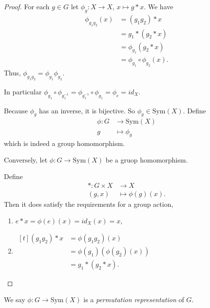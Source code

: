 \begin{proof}
    For each \(g \in G\) let \(\phi_g: X \to X\), \(x \mapsto g* x\). We have
    \begin{align*}
        \phi_{g_1 g_2}(x) &= (g_1 g_2)*x\\
        &= g_1*(g_2*x)\\
        &= \phi_{g_1}(g_2 * x)\\
        &= \phi_{g_1}\circ\phi_{g_2}(x).
    \end{align*}
    Thus, \(\phi_{g_1 g_2} = \phi_{g_1} \phi_{g_2}\).
    
    In particular \(\phi_{g_1} \circ \phi_{g_1^{-1}} = \phi_{g_1^{-1}} \circ \phi_{g_1} = \phi_e = id_X\).

    Because \(\phi_g\) has an inverse, it is bijective. So \(\phi_g \in \mathrm{Sym}(X)\).
    Define
    \begin{equation*}
    \begin{aligned}
    \phi\colon G & \longrightarrow \mathrm{Sym}(X)      \\
    g          & \longmapsto \phi_g
    \end{aligned}
    \end{equation*}
    which is indeed a group homomorphism.

    Conversely, let \(\phi: G \to \mathrm{Sym}(X)\) be a gruop homomorphism.

    Define
    \begin{equation*}
    \begin{aligned}
      *\colon G\times X & \longrightarrow X      \\
                (g,x)&\longmapsto \phi(g)(x).
    \end{aligned}
    \end{equation*}
    Then it does satisfy the requirements for a group action,
    \begin{enumerate}
        \item \(e*x = \phi(e)(x) = id_X(x) = x\),
        \item
        \(\begin{aligned}[t]
        (g_1 g_2) * x &= \phi(g_1 g_2)(x)\\
        &= \phi(g_1)(\phi(g_2)(x))\\
        &=g_1 * (g_2 * x).
        \end{aligned}\)
    \end{enumerate}
\end{proof}
\begin{definition}{}{}
    We say \(\phi: G \to \mathrm{Sym}(X)\) is a \textit{permutation representation} of \(G\).
\end{definition}
